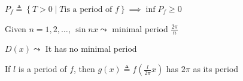 $P_f\triangleq\left\{T>0\middle|T\text{is a period of }f\right\}\implies\inf P_f\geq 0$

\begin{example}
    Given $n=1,2,\dots$, $\sin nx\leadsto$ minimal period $\frac{2\pi}{n}$
\end{example}

\begin{example}
    $D(x)\leadsto$ It has no minimal period
\end{example}

If $l$ is a period of $f$, then $g(x)\triangleq f\left(\frac{l}{2\pi}x\right)$ has $2\pi$ as its period